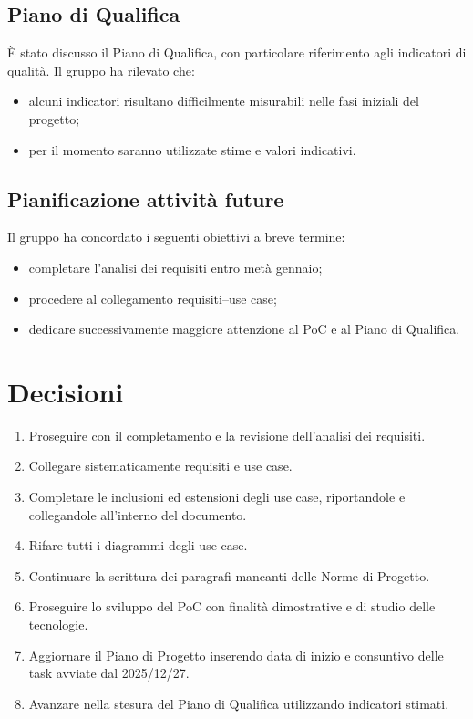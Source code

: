 \documentclass[a4paper,12pt]{article}
\begin{document}
\subsection{Piano di Qualifica}
È stato discusso il Piano di Qualifica, con particolare riferimento agli indicatori di qualità.
Il gruppo ha rilevato che:
\begin{itemize}[noitemsep]
    \item alcuni indicatori risultano difficilmente misurabili nelle fasi iniziali del progetto;
    \item per il momento saranno utilizzate stime e valori indicativi.
\end{itemize}

\subsection{Pianificazione attività future}
Il gruppo ha concordato i seguenti obiettivi a breve termine:
\begin{itemize}[noitemsep]
    \item completare l'analisi dei requisiti entro metà gennaio;
    \item procedere al collegamento requisiti–use case;
    \item dedicare successivamente maggiore attenzione al PoC e al Piano di Qualifica.
\end{itemize}


\section{Decisioni}
\begin{enumerate}[noitemsep]
    \item Proseguire con il completamento e la revisione dell'analisi dei requisiti.
    \item Collegare sistematicamente requisiti e use case.
    \item Completare le inclusioni ed estensioni degli use case, riportandole e collegandole all'interno del documento.
    \item Rifare tutti i diagrammi degli use case.
    \item Continuare la scrittura dei paragrafi mancanti delle Norme di Progetto.
    \item Proseguire lo sviluppo del PoC con finalità dimostrative e di studio delle tecnologie.
    \item Aggiornare il Piano di Progetto inserendo data di inizio e consuntivo delle task avviate dal 2025/12/27.
    \item Avanzare nella stesura del Piano di Qualifica utilizzando indicatori stimati.
\end{enumerate}
\end{document}
